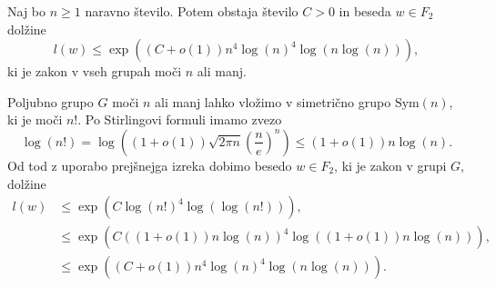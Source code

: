 \begin{posledica}\label{psl_zakon_v_splosni_grupi}
    Naj bo $n \ge 1$ naravno število. Potem obstaja število $C > 0$ in beseda $w \in F_2$ dolžine \begin{equation*}
        l(w) \le \exp{\left( (C + o(1)) n^4 \log(n)^4 \log(n \log(n)) \right)},
    \end{equation*}
    ki je zakon v vseh grupah moči $n$ ali manj.
\end{posledica}
\begin{dokaz}
    Poljubno grupo $G$ moči $n$ ali manj lahko vložimo v simetrično grupo $\text{Sym}(n)$, ki je moči $n!$. Po Stirlingovi formuli imamo zvezo \begin{equation*}
       \log(n!) = \log \left( (1+ o(1)) \sqrt{2 \pi n} \left( \frac{n}{e} \right)^n   \right) \le (1 + o(1)) n \log(n).
    \end{equation*}
    Od tod z uporabo prejšnejga izreka dobimo besedo $w \in F_2$, ki je zakon v grupi $G$, dolžine \begin{align*}
        l(w) &\le  \exp{\left(C \log(n!)^4 \log(\log(n!))\right)}, \\
            &\le \exp{\left(C ((1 + o(1)) n \log(n))^4 \log((1 + o(1)) n \log(n))\right)}, \\
            &\le \exp{\left( (C + o(1)) n^4 \log(n)^4 \log(n \log(n)) \right)}.
    \end{align*}\end{dokaz}







